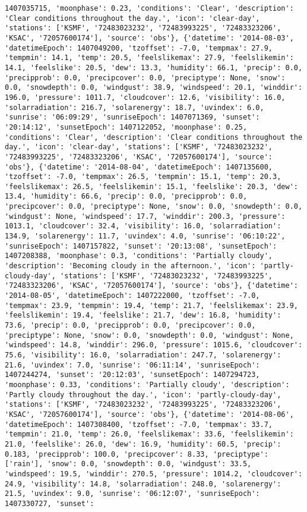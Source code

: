 \documentclass[
  letterpaper,
  DIV=11,
  numbers=noendperiod]{scrartcl}
\begin{document}
\begin{verbatim}
1407035715, 'moonphase': 0.23, 'conditions': 'Clear', 'description': 'Clear conditions throughout the day.', 'icon': 'clear-day', 'stations': ['KSMF', '72483023232', '72483993225', '72483323206', 'KSAC', '72057600174'], 'source': 'obs'}, {'datetime': '2014-08-03', 'datetimeEpoch': 1407049200, 'tzoffset': -7.0, 'tempmax': 27.9, 'tempmin': 14.1, 'temp': 20.5, 'feelslikemax': 27.9, 'feelslikemin': 14.1, 'feelslike': 20.5, 'dew': 13.3, 'humidity': 66.1, 'precip': 0.0, 'precipprob': 0.0, 'precipcover': 0.0, 'preciptype': None, 'snow': 0.0, 'snowdepth': 0.0, 'windgust': 38.9, 'windspeed': 20.1, 'winddir': 196.0, 'pressure': 1011.7, 'cloudcover': 12.6, 'visibility': 16.0, 'solarradiation': 216.7, 'solarenergy': 18.7, 'uvindex': 6.0, 'sunrise': '06:09:29', 'sunriseEpoch': 1407071369, 'sunset': '20:14:12', 'sunsetEpoch': 1407122052, 'moonphase': 0.25, 'conditions': 'Clear', 'description': 'Clear conditions throughout the day.', 'icon': 'clear-day', 'stations': ['KSMF', '72483023232', '72483993225', '72483323206', 'KSAC', '72057600174'], 'source': 'obs'}, {'datetime': '2014-08-04', 'datetimeEpoch': 1407135600, 'tzoffset': -7.0, 'tempmax': 26.5, 'tempmin': 15.1, 'temp': 20.3, 'feelslikemax': 26.5, 'feelslikemin': 15.1, 'feelslike': 20.3, 'dew': 13.4, 'humidity': 66.6, 'precip': 0.0, 'precipprob': 0.0, 'precipcover': 0.0, 'preciptype': None, 'snow': 0.0, 'snowdepth': 0.0, 'windgust': None, 'windspeed': 17.7, 'winddir': 200.3, 'pressure': 1013.1, 'cloudcover': 32.4, 'visibility': 16.0, 'solarradiation': 134.9, 'solarenergy': 11.7, 'uvindex': 4.0, 'sunrise': '06:10:22', 'sunriseEpoch': 1407157822, 'sunset': '20:13:08', 'sunsetEpoch': 1407208388, 'moonphase': 0.3, 'conditions': 'Partially cloudy', 'description': 'Becoming cloudy in the afternoon.', 'icon': 'partly-cloudy-day', 'stations': ['KSMF', '72483023232', '72483993225', '72483323206', 'KSAC', '72057600174'], 'source': 'obs'}, {'datetime': '2014-08-05', 'datetimeEpoch': 1407222000, 'tzoffset': -7.0, 'tempmax': 23.9, 'tempmin': 19.4, 'temp': 21.7, 'feelslikemax': 23.9, 'feelslikemin': 19.4, 'feelslike': 21.7, 'dew': 16.8, 'humidity': 73.6, 'precip': 0.0, 'precipprob': 0.0, 'precipcover': 0.0, 'preciptype': None, 'snow': 0.0, 'snowdepth': 0.0, 'windgust': None, 'windspeed': 14.8, 'winddir': 296.0, 'pressure': 1015.6, 'cloudcover': 75.6, 'visibility': 16.0, 'solarradiation': 247.7, 'solarenergy': 21.6, 'uvindex': 7.0, 'sunrise': '06:11:14', 'sunriseEpoch': 1407244274, 'sunset': '20:12:03', 'sunsetEpoch': 1407294723, 'moonphase': 0.33, 'conditions': 'Partially cloudy', 'description': 'Partly cloudy throughout the day.', 'icon': 'partly-cloudy-day', 'stations': ['KSMF', '72483023232', '72483993225', '72483323206', 'KSAC', '72057600174'], 'source': 'obs'}, {'datetime': '2014-08-06', 'datetimeEpoch': 1407308400, 'tzoffset': -7.0, 'tempmax': 33.7, 'tempmin': 21.0, 'temp': 26.0, 'feelslikemax': 33.6, 'feelslikemin': 21.0, 'feelslike': 26.0, 'dew': 16.9, 'humidity': 60.5, 'precip': 0.183, 'precipprob': 100.0, 'precipcover': 8.33, 'preciptype': ['rain'], 'snow': 0.0, 'snowdepth': 0.0, 'windgust': 33.5, 'windspeed': 19.5, 'winddir': 270.5, 'pressure': 1014.2, 'cloudcover': 24.9, 'visibility': 14.8, 'solarradiation': 248.0, 'solarenergy': 21.5, 'uvindex': 9.0, 'sunrise': '06:12:07', 'sunriseEpoch': 1407330727, 'sunset': 
\end{verbatim}
\end{document}
